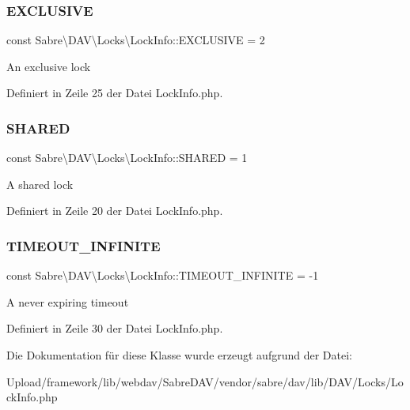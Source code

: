 \subsubsection{\texorpdfstring{E\+X\+C\+L\+U\+S\+I\+VE}{EXCLUSIVE}}
{\footnotesize\ttfamily const Sabre\textbackslash{}\+D\+A\+V\textbackslash{}\+Locks\textbackslash{}\+Lock\+Info\+::\+E\+X\+C\+L\+U\+S\+I\+VE = 2}

An exclusive lock 

Definiert in Zeile 25 der Datei Lock\+Info.\+php.

\mbox{\label{class_sabre_1_1_d_a_v_1_1_locks_1_1_lock_info_ac431119be874581bbcc74ff0e8ae5d28}} 
\subsubsection{\texorpdfstring{S\+H\+A\+R\+ED}{SHARED}}
{\footnotesize\ttfamily const Sabre\textbackslash{}\+D\+A\+V\textbackslash{}\+Locks\textbackslash{}\+Lock\+Info\+::\+S\+H\+A\+R\+ED = 1}

A shared lock 

Definiert in Zeile 20 der Datei Lock\+Info.\+php.

\mbox{\label{class_sabre_1_1_d_a_v_1_1_locks_1_1_lock_info_a0a610ef3a049cbf84a470affcf5e3a62}} 
\subsubsection{\texorpdfstring{T\+I\+M\+E\+O\+U\+T\+\_\+\+I\+N\+F\+I\+N\+I\+TE}{TIMEOUT\_INFINITE}}
{\footnotesize\ttfamily const Sabre\textbackslash{}\+D\+A\+V\textbackslash{}\+Locks\textbackslash{}\+Lock\+Info\+::\+T\+I\+M\+E\+O\+U\+T\+\_\+\+I\+N\+F\+I\+N\+I\+TE = -\/1}

A never expiring timeout 

Definiert in Zeile 30 der Datei Lock\+Info.\+php.



Die Dokumentation für diese Klasse wurde erzeugt aufgrund der Datei\+:\begin{DoxyCompactItemize}
\item 
Upload/framework/lib/webdav/\+Sabre\+D\+A\+V/vendor/sabre/dav/lib/\+D\+A\+V/\+Locks/Lock\+Info.\+php\end{DoxyCompactItemize}
